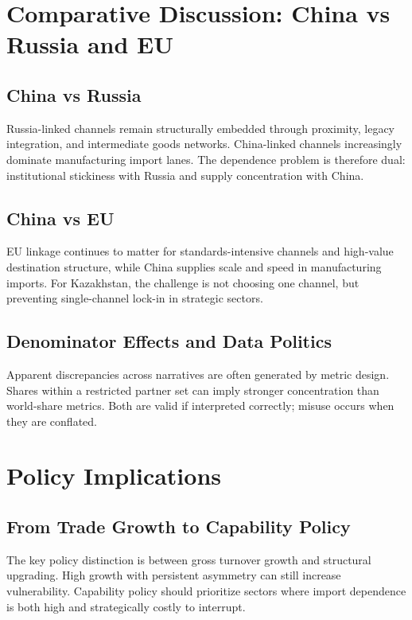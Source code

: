\documentclass[12pt]{article}
\begin{document}
\section{Comparative Discussion: China vs Russia and EU}
\subsection{China vs Russia}
Russia-linked channels remain structurally embedded through proximity, legacy integration, and intermediate goods networks. China-linked channels increasingly dominate manufacturing import lanes. The dependence problem is therefore dual: institutional stickiness with Russia and supply concentration with China.

\subsection{China vs EU}
EU linkage continues to matter for standards-intensive channels and high-value destination structure, while China supplies scale and speed in manufacturing imports. For Kazakhstan, the challenge is not choosing one channel, but preventing single-channel lock-in in strategic sectors.

\subsection{Denominator Effects and Data Politics}
Apparent discrepancies across narratives are often generated by metric design. Shares within a restricted partner set can imply stronger concentration than world-share metrics. Both are valid if interpreted correctly; misuse occurs when they are conflated.

\section{Policy Implications}
\subsection{From Trade Growth to Capability Policy}
The key policy distinction is between gross turnover growth and structural upgrading. High growth with persistent asymmetry can still increase vulnerability. Capability policy should prioritize sectors where import dependence is both high and strategically costly to interrupt.
\end{document}
